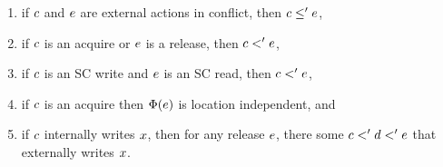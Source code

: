 \begin{definition}
\begin{enumerate}
\item\label{pre-coherence} if $c$ and $e$ are external actions in conflict,
    then $c \leq' e$,
\item\label{pre-sync} if $c$ is an acquire or $e$ is a release, then $c <' e$, 
\item\label{pre-sc} if $c$ is an SC write and $e$ is an SC read, then $c <' e$, 
\item\label{pre-acquire} if $c$ is an acquire then $\Phi(e)$
  is location independent, and
\item\label{pre-internal} if $c$ internally writes $x$, then for any
  release $e$, there some $c<'d<'e$ that externally writes $x$.

\end{enumerate}
\end{definition}

